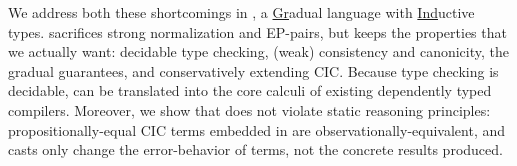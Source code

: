 


We address both these shortcomings in \lang, a \underline{Gr}adual language with \underline{Ind}uctive types.
\lang sacrifices
strong normalization and EP-pairs, but keeps the properties that we actually want: decidable type checking,
(weak) consistency and canonicity, the gradual guarantees, and conservatively extending CIC.
Because type checking is decidable, \lang can be translated into the core calculi of existing dependently typed compilers.
Moreover, we show that \lang does not violate static reasoning principles: propositionally-equal
CIC terms embedded in \lang are observationally-equivalent,
and casts only change the error-behavior of terms, not the concrete results produced.

